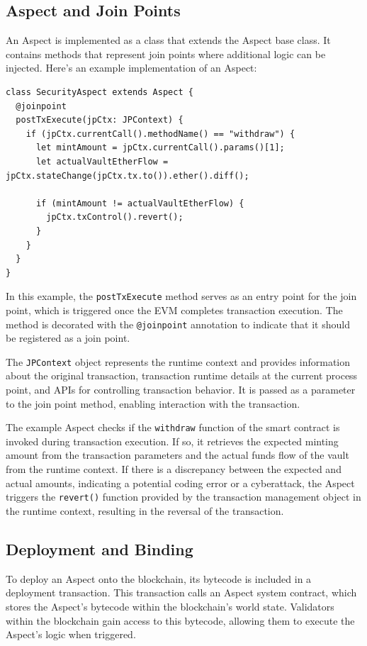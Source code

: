 \subsection{Aspect and Join Points}
An Aspect is implemented as a class that extends the Aspect base class. It contains methods that represent join points where additional logic can be injected. Here's an example implementation of an Aspect:

\begin{verbatim}
class SecurityAspect extends Aspect {
  @joinpoint
  postTxExecute(jpCtx: JPContext) {
    if (jpCtx.currentCall().methodName() == "withdraw") {
      let mintAmount = jpCtx.currentCall().params()[1];
      let actualVaultEtherFlow = jpCtx.stateChange(jpCtx.tx.to()).ether().diff();
      
      if (mintAmount != actualVaultEtherFlow) {
        jpCtx.txControl().revert();
      }
    }
  }
}
\end{verbatim}

In this example, the \texttt{postTxExecute} method serves as an entry point for the join point, which is triggered once the EVM completes transaction execution. The method is decorated with the \texttt{@joinpoint} annotation to indicate that it should be registered as a join point.

The \texttt{JPContext} object represents the runtime context and provides information about the original transaction, transaction runtime details at the current process point, and APIs for controlling transaction behavior. It is passed as a parameter to the join point method, enabling interaction with the transaction.

The example Aspect checks if the \texttt{withdraw} function of the smart contract is invoked during transaction execution. If so, it retrieves the expected minting amount from the transaction parameters and the actual funds flow of the vault from the runtime context. If there is a discrepancy between the expected and actual amounts, indicating a potential coding error or a cyberattack, the Aspect triggers the \texttt{revert()} function provided by the transaction management object in the runtime context, resulting in the reversal of the transaction.

\subsection{Deployment and Binding}
To deploy an Aspect onto the blockchain, its bytecode is included in a deployment transaction. This transaction calls an Aspect system contract, which stores the Aspect's bytecode within the blockchain's world state. Validators within the blockchain gain access to this bytecode, allowing them to execute the Aspect's logic when triggered.

